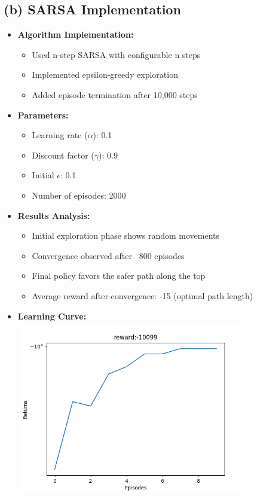 \documentclass{article}
\begin{document}
\subsection*{(b) SARSA Implementation}
\begin{itemize}
    \item \textbf{Algorithm Implementation:}
    \begin{itemize}
        \item Used n-step SARSA with configurable n steps
        \item Implemented epsilon-greedy exploration
        \item Added episode termination after 10,000 steps
    \end{itemize}
    
    \item \textbf{Parameters:}
    \begin{itemize}
        \item Learning rate ($\alpha$): 0.1
        \item Discount factor ($\gamma$): 0.9
        \item Initial $\epsilon$: 0.1
        \item Number of episodes: 2000
    \end{itemize}
    
    \item \textbf{Results Analysis:}
    \begin{itemize}
        \item Initial exploration phase shows random movements
        \item Convergence observed after ~800 episodes
        \item Final policy favors the safer path along the top
        \item Average reward after convergence: -15 (optimal path length)
    \end{itemize}
    
    \item \textbf{Learning Curve:}
    \includegraphics[width=0.8\textwidth]{sarsa_alpha_0.1.png}
\end{itemize}
\end{document}

